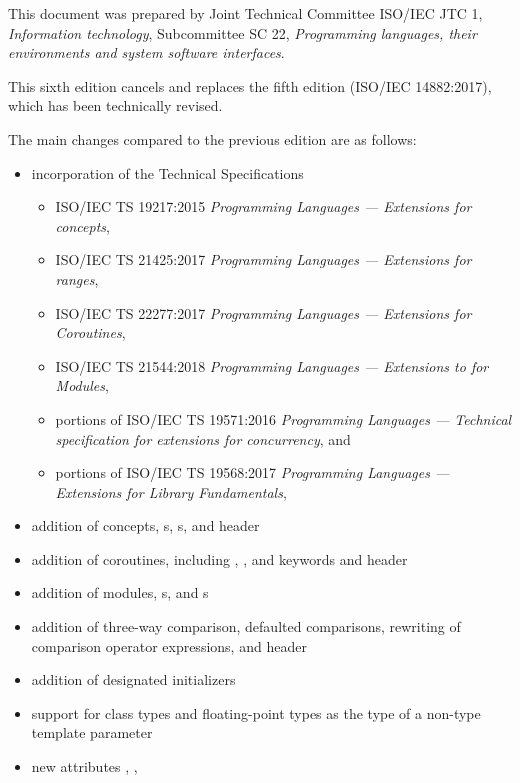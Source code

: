 This document was prepared by
Joint Technical Committee ISO/IEC JTC 1, \textit{Information technology},
Subcommittee SC 22, \textit{Programming languages, their environments and system software interfaces}.

This sixth edition cancels and replaces the fifth edition
(ISO/IEC 14882:2017), which has been technically revised.

The main changes compared to the previous edition are as follows:

\begin{itemize}
\item incorporation of the Technical Specifications
\begin{itemize}
\item ISO/IEC TS 19217:2015 \textit{Programming Languages --- \Cpp{} Extensions for concepts},
\item ISO/IEC TS 21425:2017 \textit{Programming Languages --- \Cpp{} Extensions for ranges},
\item ISO/IEC TS 22277:2017 \textit{Programming Languages --- \Cpp{} Extensions for Coroutines},
\item ISO/IEC TS 21544:2018 \textit{Programming Languages --- Extensions to \Cpp{} for Modules},
\item portions of ISO/IEC TS 19571:2016 \textit{Programming Languages --- Technical specification for \Cpp{} extensions for concurrency}, and %
\item portions of ISO/IEC TS 19568:2017 \textit{Programming Languages --- \Cpp{} Extensions for Library Fundamentals},
\end{itemize}
\item addition of concepts, s, s, and
 header
\item addition of coroutines, including
, , and  keywords and
 header
\item addition of modules, s, and s
\item addition of three-way comparison, defaulted comparisons,
rewriting of comparison operator expressions, and  header
\item addition of designated initializers
\item support for class types and floating-point types as the type of a non-type template parameter
\item new attributes , \tcode{[[likely]]}, \tcode{[[unlikely]]}

\end{itemize}
